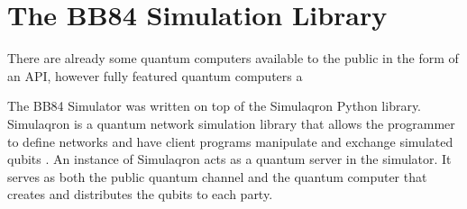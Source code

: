 \chapter{The BB84 Simulation Library}
\label{chap:implementation}
There are already some quantum computers available to the public in the form of an API, however fully featured quantum computers a


The BB84 Simulator was written on top of the Simulaqron Python library.
Simulaqron is a quantum network simulation library that allows the programmer to define networks and have client programs manipulate and exchange simulated qubits \cite{simulaqron}.
An instance of Simulaqron acts as a quantum server in the simulator.
It serves as both the public quantum channel and the quantum computer that creates and distributes the qubits to each party.


% 


